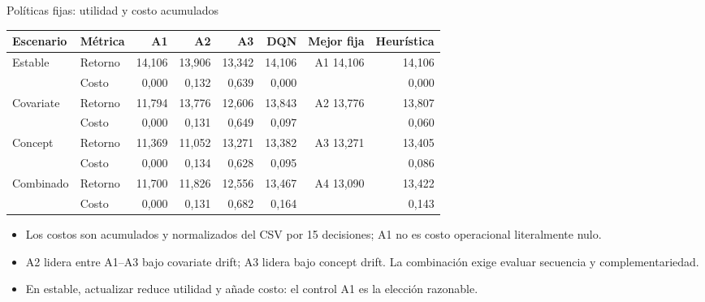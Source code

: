 \documentclass[aspectratio=169,10pt]{beamer}
\begin{document}
\begin{frame}{Políticas fijas: utilidad y costo acumulados}
\centering
\scriptsize
\begin{tabular}{llrrrrrr}
\toprule
Escenario & Métrica & A1 & A2 & A3 & DQN & Mejor fija & Heurística \\
\midrule
Estable & Retorno & 14,106 & 13,906 & 13,342 & 14,106 & A1 14,106 & 14,106 \\
         & Costo & 0,000 & 0,132 & 0,639 & 0,000 & & 0,000 \\
\midrule
Covariate & Retorno & 11,794 & 13,776 & 12,606 & 13,843 & A2 13,776 & 13,807 \\
          & Costo & 0,000 & 0,131 & 0,649 & 0,097 & & 0,060 \\
\midrule
Concept & Retorno & 11,369 & 11,052 & 13,271 & 13,382 & A3 13,271 & 13,405 \\
        & Costo & 0,000 & 0,134 & 0,628 & 0,095 & & 0,086 \\
\midrule
Combinado & Retorno & 11,700 & 11,826 & 12,556 & 13,467 & A4 13,090 & 13,422 \\
          & Costo & 0,000 & 0,131 & 0,682 & 0,164 & & 0,143 \\
\bottomrule
\end{tabular}

\vspace{0.6em}
\begin{itemize}
  \item Los costos son acumulados y normalizados del CSV por 15 decisiones; A1
        no es costo operacional literalmente nulo.
  \item A2 lidera entre A1--A3 bajo covariate drift; A3 lidera bajo concept
        drift. La combinación exige evaluar secuencia y complementariedad.
  \item En estable, actualizar reduce utilidad y añade costo: el control A1 es
        la elección razonable.
\end{itemize}
\end{frame}
\end{document}

